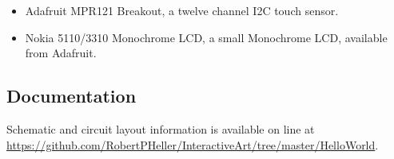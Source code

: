 \begin{itemize}
\item Adafruit MPR121 Breakout, a twelve channel I2C touch sensor.
\item Nokia 5110/3310 Monochrome LCD, a small Monochrome LCD, available from 
Adafruit.
\end{itemize}

\subsection*{Documentation}

Schematic and circuit layout information is available on line at 
\url{https://github.com/RobertPHeller/InteractiveArt/tree/master/HelloWorld}.


